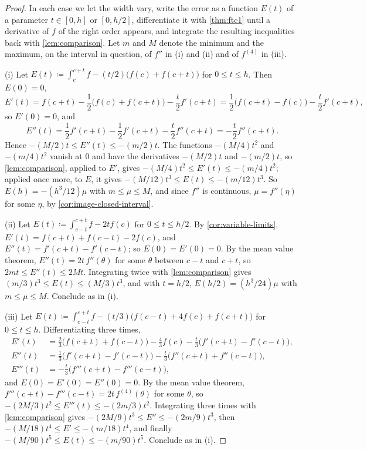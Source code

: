 \begin{proof}
In each case we let the width vary, write the error as a function $E(t)$ of a parameter $t\in[0,h]$ or $[0,h/2]$, differentiate it with \cref{thm:ftc1} until a derivative of $f$ of the right order appears, and integrate the resulting inequalities back with \cref{lem:comparison}. Let $m$ and $M$ denote the minimum and the maximum, on the interval in question, of $f''$ in (i) and (ii) and of $f^{(4)}$ in (iii).

(i) Let $E(t)\coloneqq\int_c^{c+t}f-(t/2)\bigl(f(c)+f(c+t)\bigr)$ for $0\le t\le h$. Then $E(0)=0$,
\[
E'(t)=f(c+t)-\frac12\bigl(f(c)+f(c+t)\bigr)-\frac t2f'(c+t)=\frac12\bigl(f(c+t)-f(c)\bigr)-\frac t2f'(c+t),
\]
so $E'(0)=0$, and
\[
E''(t)=\frac12f'(c+t)-\frac12f'(c+t)-\frac t2f''(c+t)=-\frac t2f''(c+t).
\]
Hence $-(M/2)t\le E''(t)\le-(m/2)t$. The functions $-(M/4)t^2$ and $-(m/4)t^2$ vanish at $0$ and have the derivatives $-(M/2)t$ and $-(m/2)t$, so \cref{lem:comparison}, applied to $E'$, gives $-(M/4)t^2\le E'(t)\le-(m/4)t^2$; applied once more, to $E$, it gives $-(M/12)t^3\le E(t)\le-(m/12)t^3$. So $E(h)=-(h^3/12)\mu$ with $m\le\mu\le M$, and since $f''$ is continuous, $\mu=f''(\eta)$ for some $\eta$, by \cref{cor:image-closed-interval}.

(ii) Let $E(t)\coloneqq\int_{c-t}^{c+t}f-2tf(c)$ for $0\le t\le h/2$. By \cref{cor:variable-limits}, $E'(t)=f(c+t)+f(c-t)-2f(c)$, and $E''(t)=f'(c+t)-f'(c-t)$; so $E(0)=E'(0)=0$. By the mean value theorem, $E''(t)=2t\,f''(\theta)$ for some $\theta$ between $c-t$ and $c+t$, so $2mt\le E''(t)\le2Mt$. Integrating twice with \cref{lem:comparison} gives $(m/3)t^3\le E(t)\le(M/3)t^3$, and with $t=h/2$, $E(h/2)=(h^3/24)\mu$ with $m\le\mu\le M$. Conclude as in (i).

(iii) Let $E(t)\coloneqq\int_{c-t}^{c+t}f-(t/3)\bigl(f(c-t)+4f(c)+f(c+t)\bigr)$ for $0\le t\le h$. Differentiating three times,
\begin{align*}
E'(t)&=\frac23\bigl(f(c+t)+f(c-t)\bigr)-\frac43f(c)-\frac t3\bigl(f'(c+t)-f'(c-t)\bigr),\\
E''(t)&=\frac13\bigl(f'(c+t)-f'(c-t)\bigr)-\frac t3\bigl(f''(c+t)+f''(c-t)\bigr),\\
E'''(t)&=-\frac t3\bigl(f'''(c+t)-f'''(c-t)\bigr),
\end{align*}
and $E(0)=E'(0)=E''(0)=0$. By the mean value theorem, $f'''(c+t)-f'''(c-t)=2t\,f^{(4)}(\theta)$ for some $\theta$, so $-(2M/3)t^2\le E'''(t)\le-(2m/3)t^2$. Integrating three times with \cref{lem:comparison} gives $-(2M/9)t^3\le E''\le-(2m/9)t^3$, then $-(M/18)t^4\le E'\le-(m/18)t^4$, and finally $-(M/90)t^5\le E(t)\le-(m/90)t^5$. Conclude as in (i).
\end{proof}

